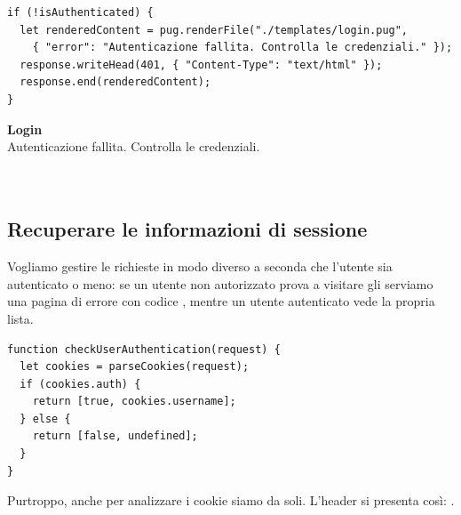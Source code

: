 \begin{affianco}[0.6][c]
\codicepiccolo
\begin{lstlisting}[style=js, name=login.js]
if (!isAuthenticated) {
  let renderedContent = pug.renderFile("./templates/login.pug",
    { "error": "Autenticazione fallita. Controlla le credenziali." });
  response.writeHead(401, { "Content-Type": "text/html" });
  response.end(renderedContent);
}
\end{lstlisting}
\risultato
\begin{browser}
  {\Lora\bfseries\LARGE Login}\\[4pt]
  {\color{css-crimson}\small Autenticazione fallita. Controlla le credenziali.}\\[6pt]
  \\[3pt]
  \wtcampo[3.2cm]{\textbullet\textbullet\textbullet\textbullet}\\[4pt]
\end{browser}
\end{affianco}

\subsection{Recuperare le informazioni di sessione}

Vogliamo gestire le richieste in modo diverso a seconda che l'utente sia
autenticato o meno: se un utente non autorizzato prova a visitare 
gli serviamo una pagina di errore con codice , mentre un utente
autenticato vede la propria lista.

\begin{lstlisting}[style=js, name=auth.js]
function checkUserAuthentication(request) {
  let cookies = parseCookies(request);
  if (cookies.auth) {
    return [true, cookies.username];
  } else {
    return [false, undefined];
  }
}
\end{lstlisting}

Purtroppo, anche per analizzare i cookie siamo da soli. L'header 
si presenta così: .

